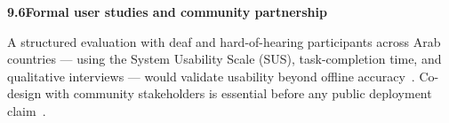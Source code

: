\noindent\textbf{9.6\quad Formal user studies and community partnership}\par
{}
\vspace{0.2cm}

\noindent A structured evaluation with deaf and hard-of-hearing participants across Arab countries --- using the System Usability Scale (SUS), task-completion time, and qualitative interviews --- would validate usability beyond offline accuracy~\cite{wcag22}. Co-design with community stakeholders is essential before any public deployment claim~\cite{who2024hearing}.\par
